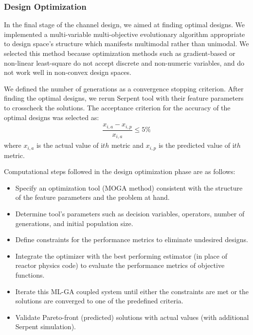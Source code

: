 \subsubsection{Design Optimization}

    In the final stage of the channel design, we aimed at finding optimal designs. We implemented a multi-variable multi-objective evolutionary algorithm appropriate to design space's structure which manifests multimodal rather than unimodal. We selected this method because optimization methods such as gradient-based or non-linear least-square do not accept discrete and non-numeric variables, and do not work well in non-convex design spaces.

    We defined the number of generations as a convergence stopping criterion. After finding the optimal designs, we rerun Serpent tool \cite{Lep2014} with their feature parameters to crosscheck the solutions. The acceptance criterion for the accuracy of the optimal designs was selected as:
    \begin{eqnarray}\label{Eq0}
    \dfrac{x_{i,a}-x_{i,p}}{x_{i,a}} \leq 5\%
    \end{eqnarray}
    where $x_{i,a}$ is the actual value of i$th$ metric and $x_{i,p}$ is the predicted value of i$th$ metric.

    Computational steps followed in the design optimization phase are as follows:
    \begin{itemize}
    	\item Specify an optimization tool (\gls{MOGA} method) consistent with the structure of the feature parameters and the problem at hand.
        \item Determine tool's parameters such as decision variables, operators, number of generations, and initial population size.
    	\item Define constraints for the performance metrics to eliminate undesired designs.
    	\item Integrate the optimizer with the best performing estimator (in place of reactor physics code) to evaluate the performance metrics of objective functions.
    	\item Iterate this \gls{ML}-\gls{GA} coupled system until either the constraints are met or the solutions are converged to one of the predefined criteria.
    	\item Validate Pareto-front (predicted) solutions with actual values (with additional Serpent simulation).
    \end{itemize}

